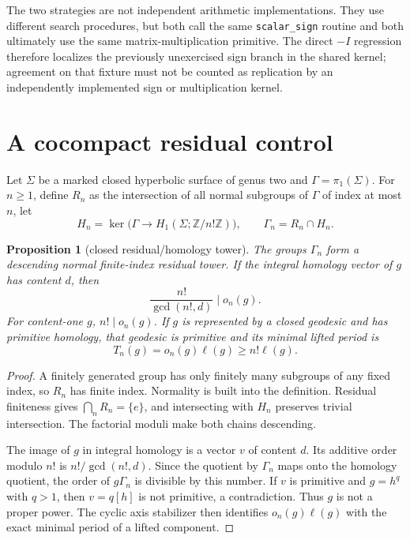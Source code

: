 \documentclass[11pt]{article}
\newtheorem{proposition}[theorem]{Proposition}
\theoremstyle{definition}
\theoremstyle{remark}
\newcommand{\ZZ}{\mathbb Z}
\begin{document}
The two strategies are not independent arithmetic implementations. They use different search procedures, but both call the same \texttt{scalar\_sign} routine and both ultimately use the same matrix-multiplication primitive. The direct $-I$ regression therefore localizes the previously unexercised sign branch in the shared kernel; agreement on that fixture must not be counted as replication by an independently implemented sign or multiplication kernel.

\section{A cocompact residual control}

Let $\Sigma$ be a marked closed hyperbolic surface of genus two and $\Gamma=\pi_1(\Sigma)$. For $n\geq1$, define $R_n$ as the intersection of all normal subgroups of $\Gamma$ of index at most $n$, let
\[
H_n=\ker\bigl(\Gamma\to H_1(\Sigma;\ZZ/n!\ZZ)\bigr),
\qquad
\Gamma_n=R_n\cap H_n.
\]

\begin{proposition}[closed residual/homology tower]\label{prop:closed}
The groups $\Gamma_n$ form a descending normal finite-index residual tower. If the integral homology vector of $g$ has content $d$, then
\[
\frac{n!}{\gcd(n!,d)}\mid o_n(g).
\]
For content-one $g$, $n!\mid o_n(g)$. If $g$ is represented by a closed geodesic and has primitive homology, that geodesic is primitive and its minimal lifted period is
\[
T_n(g)=o_n(g)\ell(g)\geq n!\ell(g).
\]
\end{proposition}

\begin{proof}
A finitely generated group has only finitely many subgroups of any fixed index, so $R_n$ has finite index. Normality is built into the definition. Residual finiteness gives $\bigcap_nR_n=\{e\}$, and intersecting with $H_n$ preserves trivial intersection. The factorial moduli make both chains descending.

The image of $g$ in integral homology is a vector $v$ of content $d$. Its additive order modulo $n!$ is $n!/\gcd(n!,d)$. Since the quotient by $\Gamma_n$ maps onto the homology quotient, the order of $g\Gamma_n$ is divisible by this number. If $v$ is primitive and $g=h^q$ with $q>1$, then $v=q[h]$ is not primitive, a contradiction. Thus $g$ is not a proper power. The cyclic axis stabilizer then identifies $o_n(g)\ell(g)$ with the exact minimal period of a lifted component.
\end{proof}
\end{document}
